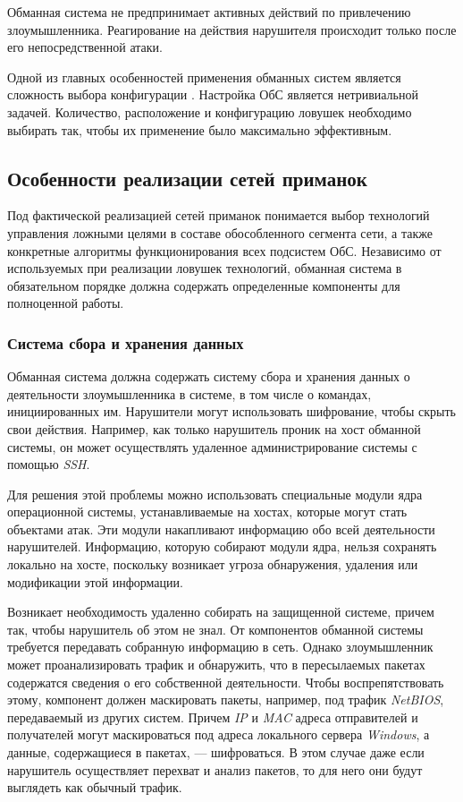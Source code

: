 Обманная система не предпринимает активных действий по привлечению злоумышленника. Реагирование на действия нарушителя происходит только после его непосредственной атаки.

Одной из главных особенностей применения обманных систем является сложность выбора конфигурации \citep{rajan}. Настройка ОбС является нетривиальной задачей. Количество, расположение и конфигурацию ловушек необходимо выбирать так, чтобы их применение было максимально эффективным.

\subsection{Особенности реализации сетей приманок}

Под фактической реализацией сетей приманок понимается выбор технологий управления ложными целями в составе обособленного сегмента сети, а также конкретные алгоритмы функционирования всех подсистем ОбС.  Независимо от используемых при реализации ловушек технологий, обманная система в обязательном порядке должна содержать определенные  компоненты для полноценной работы.

\subsubsection{Система сбора и хранения данных}\hspace*{\fill}

Обманная система должна содержать систему сбора и хранения данных о деятельности злоумышленника в системе, в том числе о командах, инициированных им. Нарушители могут использовать шифрование, чтобы скрыть свои действия. Например, как только нарушитель проник на хост обманной системы, он может осуществлять удаленное администрирование системы с помощью \textit{SSH}.

Для решения этой проблемы можно использовать специальные модули ядра операционной системы, устанавливаемые на хостах, которые могут стать объектами атак. Эти модули накапливают информацию обо всей деятельности нарушителей. Информацию, которую собирают модули ядра, нельзя сохранять локально на хосте, поскольку возникает угроза обнаружения, удаления или модификации этой информации. 

Возникает необходимость удаленно собирать на защищенной системе, причем так, чтобы нарушитель об этом не знал. От компонентов обманной системы требуется передавать собранную информацию в сеть. Однако злоумышленник может проанализировать трафик и обнаружить, что в пересылаемых пакетах содержатся сведения о его собственной деятельности. Чтобы воспрепятствовать этому, компонент должен маскировать пакеты, например, под трафик \textit{NetBIOS}, передаваемый из других систем. Причем \textit{IP} и \textit{MAC} адреса отправителей и получателей могут маскироваться под адреса локального сервера \textit{Windows}, а данные, содержащиеся в пакетах, — шифроваться. В этом случае даже если нарушитель осуществляет перехват и анализ пакетов, то для него они будут выглядеть как обычный трафик.

